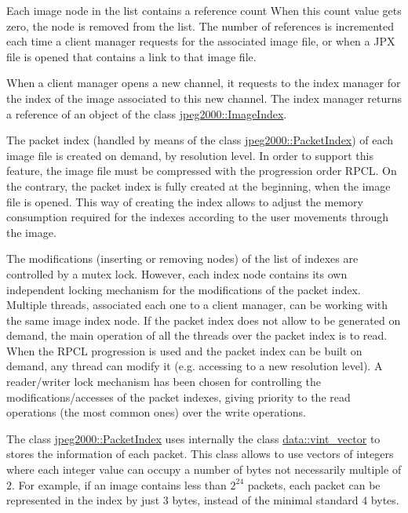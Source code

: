 Each image node in the list contains a reference count When this
count value gets zero, the node is removed from the list. The number
of references is incremented each time a client manager requests
for the associated image file, or when a JPX file is opened that
contains a link to that image file. 

When a client manager opens a new channel, it requests to the index 
manager for the index of the image associated to this new channel.
The index manager returns a reference of an object of the class
\hyperlink{classjpeg2000_1_1ImageIndex}{jpeg2000::ImageIndex}. 

The packet index (handled by means of the class 
\hyperlink{classjpeg2000_1_1PacketIndex}{jpeg2000::PacketIndex}) of
each image file is created on demand, by resolution level. In order
to support this feature, the image file must be compressed
with the progression order RPCL. On the contrary, the packet index
is fully created at the beginning, when the image file is opened.
This way of creating the index allows to adjust the memory
consumption required for the indexes according to the user
movements through the image.

The modifications (inserting or removing nodes) of the list of indexes 
are controlled by a mutex lock. However, each index node contains its
own independent locking mechanism for the modifications of the packet
index. Multiple threads, associated each one to a client manager,
can be working with the same image index node. If the packet index
does not allow to be generated on demand, the main operation of
all the threads over the packet index is to read. When the RPCL
progression is used and the packet index can be built on demand,
any thread can modify it (e.g. accessing to a new resolution
level). A reader/writer lock mechanism has been chosen for controlling
the modifications/accesses of the packet indexes, giving priority to
the read operations (the most common ones) over the write operations.

The class \hyperlink{classjpeg2000_1_1PacketIndex}{jpeg2000::PacketIndex}
uses internally the class \hyperlink{classdata_1_1vint__vector}
{data::vint\_vector} to stores the information of each packet. This
class allows to use vectors of integers where each integer value can
occupy a number of bytes not necessarily multiple of $2$. For example,
if an image contains less than $2^{24}$ packets, each packet can
be represented in the index by just $3$ bytes, instead of the minimal
standard $4$ bytes. 


